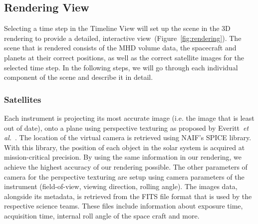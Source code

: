 \documentclass[journal]{vgtc}                %
\def\etal{\textit{et al.}}
\def\etal{\textit{et al.}}
\begin{document}
\subsection{Rendering View} \label{sec:rendering}
Selecting a time step in the Timeline View will set up the scene in the 3D rendering to provide a detailed, interactive view~(Figure~\ref{fig:rendering}). The scene that is rendered consists of the MHD volume data, the spacecraft and planets at their correct positions, as well as the correct satellite images for the selected time step. In the following steps, we will go through each individual component of the scene and describe it in detail. 

\subsubsection{Satellites} \label{sec:satellites}
Each instrument is projecting its most accurate image (i.e. the image that is least out of date), onto a plane using perspective texturing as proposed by Everitt~\etal~\cite{Everitt:2001tg}. The location of the virtual camera is retrieved using NAIF's SPICE library. With this library, the position of each object in the solar system is acquired at mission-critical precision. By using the same information in our rendering, we achieve the highest accuracy of our rendering possible. The other parameters of camera for the perspective texturing are setup using camera parameters of the instrument (field-of-view, viewing direction, rolling angle). The images data, alongside its metadata, is retrieved from the FITS file format that is used by the respective science teams. These files include information about exposure time, acquisition time, internal roll angle of the space craft and more.
\end{document}
